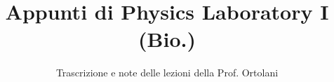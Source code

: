 \documentclass[a4paper,12pt]{article}
\title{Appunti di Physics Laboratory I (Bio.)}
\author{Trascrizione e note delle lezioni della Prof. Ortolani}
\date{}
\begin{document}
\maketitle
\projectintro
\tableofcontents
\newpage

\end{document}
